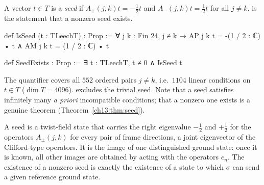 \begin{definition}[seed]\label{ch13:def:seed}
A vector $t\in T$ is a \emph{seed} if $A_+(j,k)t=-\tfrac12t$ and $A_-(j,k)t=\tfrac12t$ for all $j\ne k$.
 is the statement that a nonzero seed exists.
\end{definition}
\begin{leancode}
def IsSeed (t : TLeechT) : Prop :=
  ∀ j k : Fin 24, j ≠ k → AP j k t = -(1 / 2 : ℂ) • t ∧ AM j k t = (1 / 2 : ℂ) • t

def SeedExists : Prop := ∃ t : TLeechT, t ≠ 0 ∧ IsSeed t
\end{leancode}
\begin{dictionary}
The quantifier covers all $552$ ordered pairs $j\ne k$, i.e.\ $1104$ linear conditions on $t\in T$
($\dim T=4096$).  excludes the trivial seed. Note that a seed satisfies infinitely many
\emph{a priori} incompatible conditions; that a nonzero one exists is a genuine theorem
(Theorem~\ref{ch13:thm:seed}).
\end{dictionary}
\begin{physics}
A seed is a twist-field state that carries the right eigenvalue $-\tfrac12$ and $+\tfrac12$ for the operators $A_\pm(j,k)$ for every pair of frame directions, a joint eigenvector of the Clifford-type operators. It is the image of one distinguished ground state: once it is known, all other images are obtained by acting with the operators $e_n$. The existence of a nonzero seed is exactly the existence of a state to which $\sigma$ can send a given reference ground state.
\end{physics}

